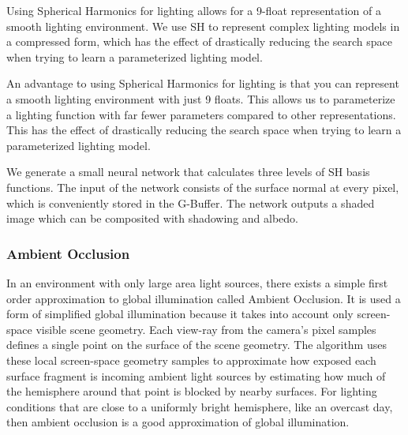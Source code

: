 \documentclass[10pt,twocolumn,letterpaper]{article}
\newcommand{\tompson}[1]{{\color{green} JT: #1}}
\begin{document}
Using Spherical Harmonics for lighting allows for a 9-float representation of a smooth lighting environment. We use SH to represent complex lighting models in a compressed form, which has the effect of drastically reducing the search space when trying to learn a parameterized lighting model.

An advantage to using Spherical Harmonics for lighting is that you can represent a smooth lighting environment with just 9 floats. This allows us to parameterize a lighting function with far fewer parameters compared to other representations. This has the effect of drastically reducing the search space when trying to learn a parameterized lighting model.

We generate a small neural network that calculates three levels of SH basis functions. The input of the network consists of the surface normal at every pixel, which is conveniently stored in the G-Buffer. The network outputs a shaded image which can be composited with shadowing and albedo.

\subsubsection{Ambient Occlusion}

In an environment with only large area light sources, there exists a simple first order approximation to global illumination called Ambient Occlusion. It is used a form of simplified global illumination because it takes into account only screen-space visible  scene geometry\cite{Miller:1994:EAL:192161.192244}.  Each view-ray from the camera's pixel samples defines a single point on the surface of the scene geometry. The algorithm uses these local screen-space geometry samples to approximate how exposed each surface fragment is incoming ambient light sources by estimating how much of the hemisphere around that point is blocked by nearby surfaces. For lighting conditions that are close to a uniformly bright hemisphere, like an overcast day, then ambient occlusion is a good approximation of global illumination.

\end{document}
